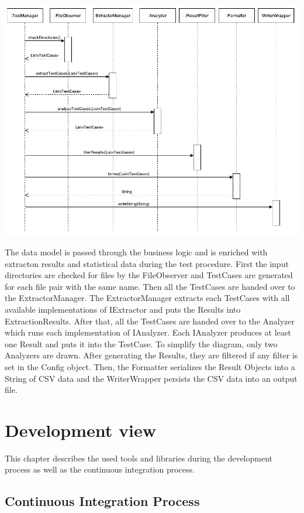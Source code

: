 \includegraphics[width=15cm]{Figures/activityDiagram.pdf}

The data model is passed through the business logic and is enriched with extracton results and statistical data during the test procedure. First the input directories are checked for files by the FileObserver and TestCases are generated for each file pair with the same name. Then all the TestCases are handed over to the ExtractorManager. The ExtractorManager extracts each TestCases with all available implementations of IExtractor and puts the Results into ExtractionResults. After that, all the TestCases are handed over to the Analyzer which runs each implementation of IAnalyzer. Each IAnalyzer produces at least one Result and puts it into the TestCase. To simplify the diagram, only two Analyzers are drawn. After generating the Results, they are filtered if any filter is set in the Config object. Then, the Formatter serializes the Result Objects into a String of CSV data and the WriterWrapper persists the CSV data into an output file.


\section{Development view}
\label{architecture:developmentView}

This chapter describes the used tools and libraries during the development process as well as the continuous integration process.


\subsection{Continuous Integration Process}

